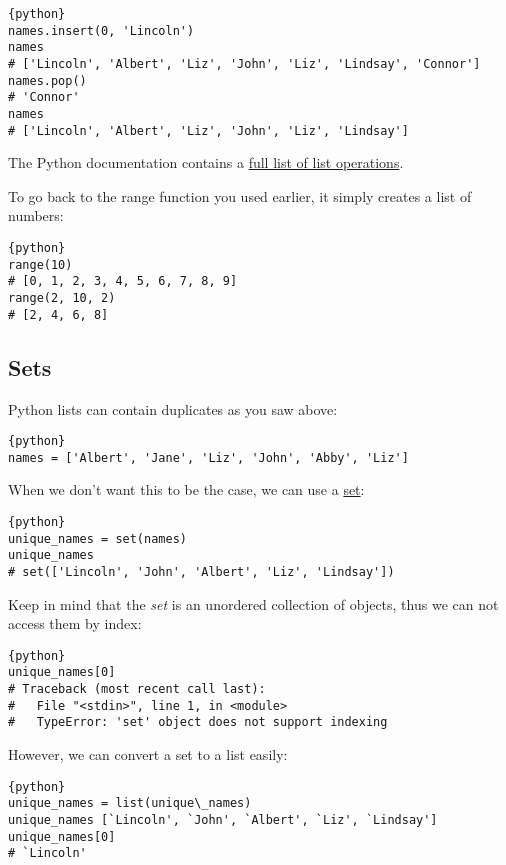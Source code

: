 \begin{lstlisting}{python}
names.insert(0, 'Lincoln')
names
# ['Lincoln', 'Albert', 'Liz', 'John', 'Liz', 'Lindsay', 'Connor']
names.pop()
# 'Connor'
names
# ['Lincoln', 'Albert', 'Liz', 'John', 'Liz', 'Lindsay']
\end{lstlisting}

The Python documentation contains a \href{}{full list of list
operations}.

To go back to the range function you used earlier, it simply creates a
list of numbers:

\begin{lstlisting}{python}
range(10)
# [0, 1, 2, 3, 4, 5, 6, 7, 8, 9]
range(2, 10, 2)
# [2, 4, 6, 8]
\end{lstlisting}

\subsection{Sets}\label{sets}

Python lists can contain duplicates as you saw above:

\begin{lstlisting}{python}
names = ['Albert', 'Jane', 'Liz', 'John', 'Abby', 'Liz']
\end{lstlisting}

When we don't want this to be the case, we can use a
\href{https://docs.python.org/2/library/stdtypes.html\#set}{set}:

\begin{lstlisting}{python}
unique_names = set(names)
unique_names
# set(['Lincoln', 'John', 'Albert', 'Liz', 'Lindsay'])
\end{lstlisting}

Keep in mind that the \emph{set} is an unordered collection of objects,
thus we can not access them by index:

\begin{lstlisting}{python}
unique_names[0]
# Traceback (most recent call last):
#   File "<stdin>", line 1, in <module>
#   TypeError: 'set' object does not support indexing
\end{lstlisting}

However, we can convert a set to a list easily:

\begin{lstlisting}{python}
unique_names = list(unique\_names) 
unique_names [`Lincoln', `John', `Albert', `Liz', `Lindsay']
unique_names[0]
# `Lincoln'
\end{lstlisting}


